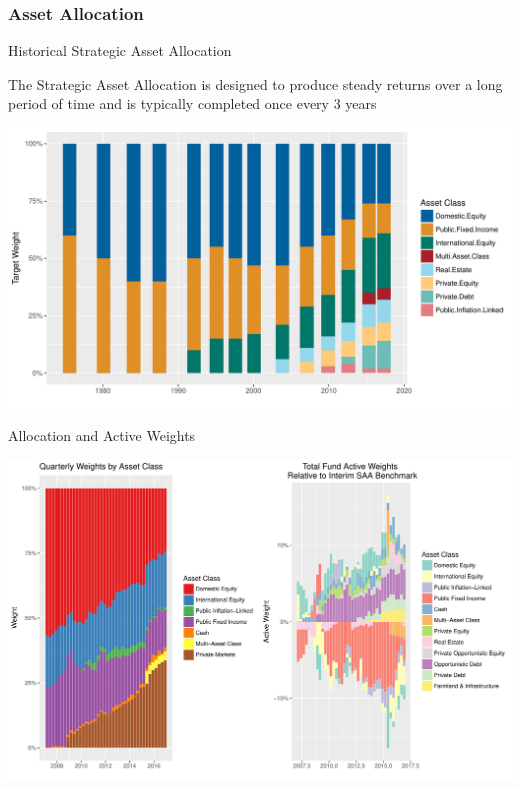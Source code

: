 \documentclass[10pt,english]{beamer}\usepackage[]{graphicx}\usepackage[]{color}
\makeatletter
\def\maxwidth{ %
  \ifdim\Gin@nat@width>\linewidth
    \linewidth
  \else
    \Gin@nat@width
  \fi
}
\newenvironment{knitrout}{}{} %
\makeatother
\begin{document}
\subsubsection{Asset Allocation}
\begin{frame}[fragile]{Historical Strategic Asset Allocation}

The Strategic Asset Allocation is designed to produce steady returns
over a long period of time and is typically completed once every 3
years

\begin{knitrout}
\color{fgcolor}
\includegraphics[width=\maxwidth]{figure/saa-1} 

\end{knitrout}
\end{frame}
%
\begin{frame}[fragile]{Allocation and Active Weights}

\begin{knitrout}
\color{fgcolor}
\includegraphics[width=\maxwidth]{figure/tf_weights-1} 

\end{knitrout}
\end{frame}
%
\end{document}
